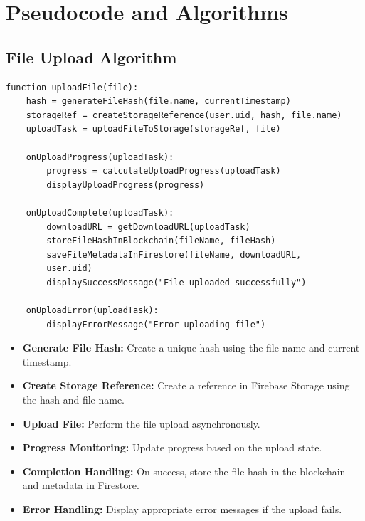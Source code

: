 \documentclass[12pt,a4paper]{report}
\begin{document}
\section{Pseudocode and Algorithms}

\subsection{File Upload Algorithm}

\begin{lstlisting}[caption=File Upload Algorithm]
   function uploadFile(file):
    hash = generateFileHash(file.name, currentTimestamp)
    storageRef = createStorageReference(user.uid, hash, file.name)
    uploadTask = uploadFileToStorage(storageRef, file)

    onUploadProgress(uploadTask):
        progress = calculateUploadProgress(uploadTask)
        displayUploadProgress(progress)

    onUploadComplete(uploadTask):
        downloadURL = getDownloadURL(uploadTask)
        storeFileHashInBlockchain(fileName, fileHash)
        saveFileMetadataInFirestore(fileName, downloadURL, 
        user.uid)
        displaySuccessMessage("File uploaded successfully")

    onUploadError(uploadTask):
        displayErrorMessage("Error uploading file")

   \end{lstlisting}
   
\begin{itemize}
   \item \textbf{Generate File Hash:} Create a unique hash using the file name and current timestamp.
   \item \textbf{Create Storage Reference:} Create a reference in Firebase Storage using the hash and file name.
   \item \textbf{Upload File:} Perform the file upload asynchronously.
   \item \textbf{Progress Monitoring:} Update progress based on the upload state.
   \item \textbf{Completion Handling:} On success, store the file hash in the blockchain and metadata in Firestore.
   \item \textbf{Error Handling:} Display appropriate error messages if the upload fails.
\end{itemize}
\end{document}

